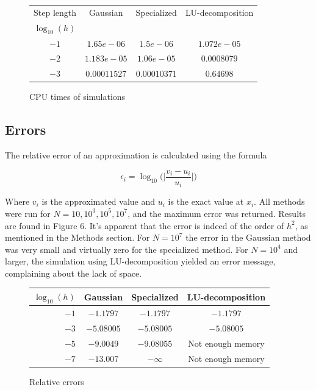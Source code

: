 \documentclass[11pt]{article}
\begin{document}
\begin{figure}[ht]\label{CPU times N=1,2,3}
\centering
\begin{tabular}{|c|c|c|c|}
\hline
Step length  & Gaussian & Specialized & LU-decomposition \\
$\log_{10}(h)$ & & & \\
\hline
$-1$ & $1.65e-06$ & $1.5e-06$& $1.072e-05$\\
$-2$ & $1.183e-05$ & $1.06e-05$ & $0.0008079$ \\
$-3$ & $0.00011527$ & $0.00010371$ & $0.64698$\\
\hline
\end{tabular}
\caption{CPU times of simulations}
\end{figure}

\subsection*{Errors}

\begin{flushleft}
The relative error of an approximation is calculated using the formula \cite{hjorth2011computational}

\begin{equation}
\epsilon_i = \log_{10} \Big( \Big| \frac{v_i-u_i}{u_i} \Big| \Big) 
\end{equation}

Where $v_i$ is the approximated value and $u_i$ is the exact value at $x_i$. All methods were run for $N=10, 10^3, 10^5, 10^7$, and the maximum error was returned. Results are found in Figure $6$. It's apparent that the error is indeed of the order of $h^2$, as mentioned in the Methods section. For $N=10^7$ the error in the Gaussian method was very small and virtually zero for the specialized method. For $N=10^4$ and larger, the simulation using LU-decomposition yielded an error message, complaining about the lack of space.
\end{flushleft}

\begin{figure}[ht]\label{Relative errors}
\centering
\begin{tabular}{|r|c|c|c|}
\hline
$\log_{10}(h)$ & Gaussian & Specialized & LU-decomposition \\
\hline
$-1$ & $-1.1797$ & $-1.1797$ & $-1.1797$ \\
$-3$ & $-5.08005$ & $-5.08005$ & $-5.08005$\\
$-5$ & $-9.0049$ & $-9.08055$ & Not enough memory\\
$-7$ & $-13.007$ & $-\infty$ & Not enough memory\\
\hline
\end{tabular}
\caption{Relative errors}
\end{figure}
\end{document}
